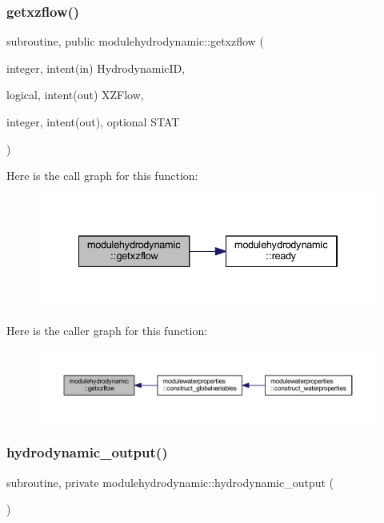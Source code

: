 \subsubsection{\texorpdfstring{getxzflow()}{getxzflow()}}
{\footnotesize\ttfamily subroutine, public modulehydrodynamic\+::getxzflow (\begin{DoxyParamCaption}\item[{integer, intent(in)}]{Hydrodynamic\+ID,  }\item[{logical, intent(out)}]{X\+Z\+Flow,  }\item[{integer, intent(out), optional}]{S\+T\+AT }\end{DoxyParamCaption})}

Here is the call graph for this function\+:\nopagebreak
\begin{figure}[H]
\begin{center}
\leavevmode
\includegraphics[width=334pt]{namespacemodulehydrodynamic_af349d31454a6c7a674ed8d54430b0e52_cgraph}
\end{center}
\end{figure}
Here is the caller graph for this function\+:\nopagebreak
\begin{figure}[H]
\begin{center}
\leavevmode
\includegraphics[width=350pt]{namespacemodulehydrodynamic_af349d31454a6c7a674ed8d54430b0e52_icgraph}
\end{center}
\end{figure}
\mbox{\label{namespacemodulehydrodynamic_a60b8585327586b632ce2934f2676df87}} 
\subsubsection{\texorpdfstring{hydrodynamic\+\_\+output()}{hydrodynamic\_output()}}
{\footnotesize\ttfamily subroutine, private modulehydrodynamic\+::hydrodynamic\+\_\+output (\begin{DoxyParamCaption}{ }\end{DoxyParamCaption})\hspace{0.3cm}{\ttfamily [private]}}

